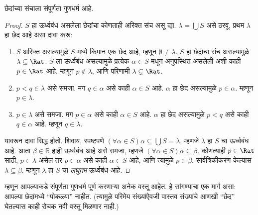 \documentclass[../../../include/open-logic-section]{subfiles}
\begin{document}
\begin{thm}
छेदांच्या संचाला संपूर्णता गुणधर्म आहे.
\end{thm}

\begin{proof}
$S$ हा ऊर्ध्वबंध असलेला छेदांचा कोणताही अरिक्त संच असू द्या. $\lambda
= \bigcup S$ असे ठरवू.
प्रथम $\lambda$ हा छेद आहे असा दावा करू:
\begin{enumerate}
\item $S$ अरिक्त असल्यामुळे $S$ मध्ये किमान एक छेद आहे, म्हणून
$\emptyset \neq \lambda$. $S$ हा छेदांचा संच असल्यामुळे $\lambda
\subseteq \Rat$. $S$ ला ऊर्ध्वबंध असल्यामुळे प्रत्येक $\alpha \in S$
मधून अनुपस्थित असलेली अशी काही $p \in \Rat$ आहे. म्हणून $p\notin \lambda$,
आणि परिणामी $\lambda \subsetneq \Rat$.
\item $p < q \in \lambda$ असे समजा. मग $q \in \alpha$ असे काही
$\alpha \in S$ आहे. $\alpha$ हा छेद असल्यामुळे $p \in \alpha$.
म्हणून $p \in \lambda$.
\item $p \in \lambda$ असे समजा. मग $p \in \alpha$ असे काही
$\alpha \in S$ आहे. $\alpha$ हा छेद असल्यामुळे $p < q$ असे काही
$q \in \alpha$ आहे. म्हणून $q \in \lambda$.
\end{enumerate}
यावरून दावा सिद्ध होतो. शिवाय, स्पष्टपणे $(\forall \alpha \in S)\alpha
\subseteq \bigcup S = \lambda$, म्हणजे $\lambda$ हा $S$ चा ऊर्ध्वबंध
आहे. आता $\beta \in \mathbb{R}$ हाही ऊर्ध्वबंध आहे असे समजा, म्हणजे
$(\forall \alpha \in S)\alpha \subseteq \beta$. कोणत्याही $p \in \Rat$
साठी, $p \in \lambda$ असेल तर $p \in \alpha$ असे काही $\alpha \in S$
आहे, आणि त्यामुळे $p \in \beta$. सार्वत्रिकीकरण केल्यास $\lambda
\subseteq \beta$. म्हणून $\lambda$ हा $S$ चा \emph{लघुतम} ऊर्ध्वबंध आहे.
\end{proof}

म्हणून आपल्याकडे संपूर्णता गुणधर्म पूर्ण करणाऱ्या अनेक वस्तू आहेत.
हे सांगण्याचा एक मार्ग असा: आपल्या छेदांमध्ये ``पोकळ्या'' नाहीत.
(त्यामुळे परिमेय संख्यांऐवजी वास्तव संख्यांचे आणखी ``छेद'' घेतल्यास
काही रोचक नवी वस्तू मिळणार नाही.)
\end{document}
